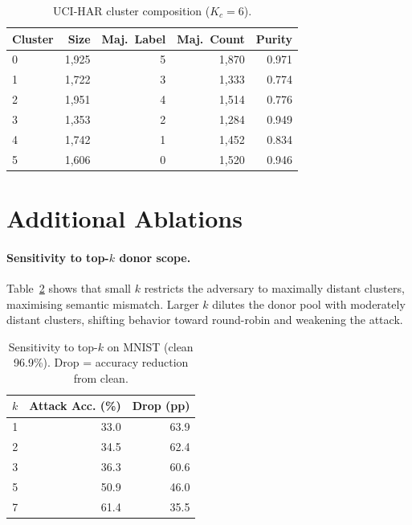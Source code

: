 \documentclass{article}
\begin{document}
\begin{table}[h]
\centering
\caption{UCI-HAR cluster composition ($K_c\!=\!6$).}
\label{tab:har_clusters}
\small
\begin{tabular}{lrrrr}
\toprule
\textbf{Cluster} & \textbf{Size} & \textbf{Maj.~Label} & \textbf{Maj.~Count} & \textbf{Purity} \\
\midrule
0 & 1,925 & 5 & 1,870 & 0.971 \\
1 & 1,722 & 3 & 1,333 & 0.774 \\
2 & 1,951 & 4 & 1,514 & 0.776 \\
3 & 1,353 & 2 & 1,284 & 0.949 \\
4 & 1,742 & 1 & 1,452 & 0.834 \\
5 & 1,606 & 0 & 1,520 & 0.946 \\
\bottomrule
\end{tabular}
\end{table}

\section{Additional Ablations}
\label{app:ablations}

\paragraph{Sensitivity to top-$k$ donor scope.}
Table~\ref{tab:topk_sensitivity} shows that small $k$ restricts the adversary
to maximally distant clusters, maximising semantic mismatch.
Larger $k$ dilutes the donor pool with moderately distant clusters,
shifting behavior toward round-robin and weakening the attack.

\begin{table}[h]
\centering
\caption{Sensitivity to top-$k$ on MNIST (clean 96.9\%). Drop = accuracy
  reduction from clean.}
\label{tab:topk_sensitivity}
\small
\begin{tabular}{crr}
\toprule
$k$ & \textbf{Attack Acc. (\%)} & \textbf{Drop (pp)} \\
\midrule
1 & 33.0 & 63.9 \\
2 & 34.5 & 62.4 \\
3 & 36.3 & 60.6 \\
5 & 50.9 & 46.0 \\
7 & 61.4 & 35.5 \\
\bottomrule
\end{tabular}
\end{table}

\end{document}
